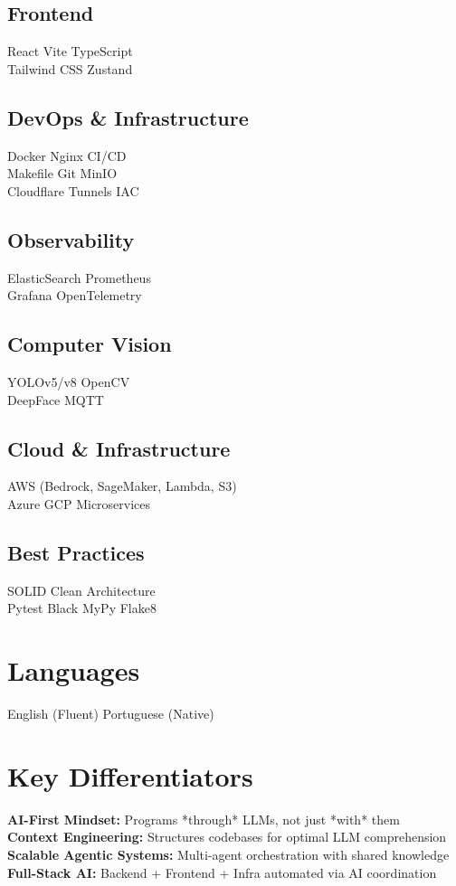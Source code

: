 \documentclass[]{deedy-resume-reversed}
\providecommand{\sectionsep}{\vspace{6pt}} %
\begin{document}
\begin{minipage}[t]{0.35\textwidth}
\subsection{Frontend}
React \textbullet{} Vite \textbullet{} TypeScript \\
Tailwind CSS \textbullet{} Zustand

\subsection{DevOps \& Infrastructure}
Docker \textbullet{} Nginx \textbullet{} CI/CD \\
Makefile \textbullet{} Git \textbullet{} MinIO \\
Cloudflare Tunnels \textbullet{} IAC
\sectionsep

\subsection{Observability}
ElasticSearch \textbullet{} Prometheus \\
Grafana \textbullet{} OpenTelemetry
\sectionsep

\subsection{Computer Vision}
YOLOv5/v8 \textbullet{} OpenCV \\
DeepFace \textbullet{} MQTT
\sectionsep

\subsection{Cloud \& Infrastructure}
AWS (Bedrock, SageMaker, Lambda, S3) \\
Azure \textbullet{} GCP \textbullet{} Microservices
\sectionsep

\subsection{Best Practices}
SOLID \textbullet{} Clean Architecture \\
Pytest \textbullet{} Black \textbullet{} MyPy \textbullet{} Flake8
\sectionsep

\section{Languages}
English (Fluent) \textbullet{} Portuguese (Native)
\sectionsep

\section{Key Differentiators}
\textbf{AI-First Mindset:} Programs *through* LLMs, not just *with* them \\
\textbf{Context Engineering:} Structures codebases for optimal LLM comprehension \\
\textbf{Scalable Agentic Systems:} Multi-agent orchestration with shared knowledge \\
\textbf{Full-Stack AI:} Backend + Frontend + Infra automated via AI coordination
\sectionsep

\end{minipage}
\end{document}
